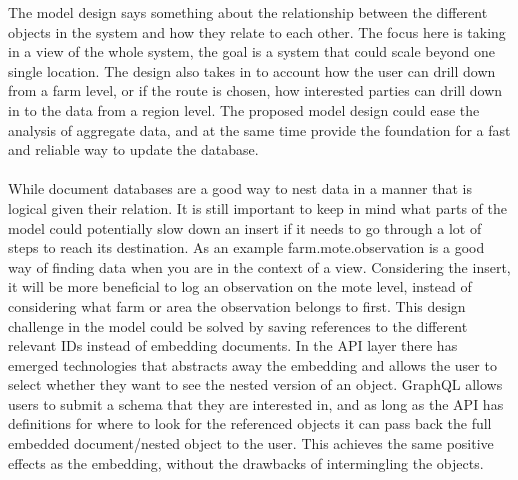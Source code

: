 \documentclass[]{uiophd}
\begin{document}
The model design says something about the relationship between the different objects in the system and how they relate to each other. The focus here is taking in a view of the whole system, the goal is a system that could scale beyond one single location. The design also takes in to account how the user can drill down from a farm level, or if the route is chosen, how interested parties can drill down in to the data from a region level. The proposed model design could ease the analysis of aggregate data, and at the same time provide the foundation for a fast and reliable way to update the database.
\\\\
While document databases are a good way to nest data in a manner that is logical given their relation. It is still important to keep in  mind what parts of the model could potentially slow down an insert if it needs to go through a lot of steps to reach its destination. As an example farm.mote.observation is a good way of finding data when you are in the context of a view. Considering the insert, it will be more beneficial to log an observation on the mote level, instead of considering what farm or area the observation belongs to first. This design challenge in the model could be solved by saving references to the different relevant IDs instead of embedding documents. In the API layer there has emerged technologies that abstracts away the embedding and allows the user to select whether they want to see the nested version of an object. GraphQL allows users to submit a schema that they are interested in, and as long as the API has definitions for where to look for the referenced objects it can pass back the full embedded document/nested object to the user. This achieves the same positive effects as the embedding, without the drawbacks of intermingling the objects.
\end{document}
